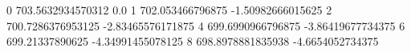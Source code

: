 0 703.5632934570312 0.0
1 702.053466796875 -1.50982666015625
2 700.7286376953125 -2.83465576171875
4 699.6990966796875 -3.86419677734375
6 699.21337890625 -4.34991455078125
8 698.8978881835938 -4.6654052734375
